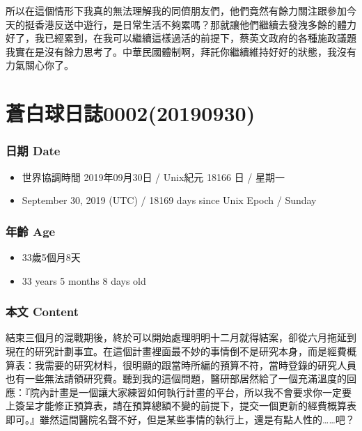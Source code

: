 \documentclass[a5paper, 12pt
]{book}
\providecommand{\tightlist}{%
  \setlength{\itemsep}{0pt}\setlength{\parskip}{0pt}}
\begin{document}
所以在這個情形下我真的無法理解我的同儕朋友們，他們竟然有餘力關注跟參加今天的挺香港反送中遊行，是日常生活不夠累嗎？那就讓他們繼續去發洩多餘的體力好了，我已經累到，在我可以繼續這樣過活的前提下，蔡英文政府的各種施政議題我實在是沒有餘力思考了。中華民國體制啊，拜託你繼續維持好好的狀態，我沒有力氣關心你了。

\hypertarget{ux84bcux767dux7403ux65e5ux8a8c000220190930}{%
\section{蒼白球日誌0002(20190930)}\label{ux84bcux767dux7403ux65e5ux8a8c000220190930}}

\hypertarget{ux65e5ux671f-date-1}{%
\subsubsection{日期 Date}\label{ux65e5ux671f-date-1}}

\begin{itemize}
\tightlist
\item
  世界協調時間 2019年09月30日 / Unix紀元 18166 日 / 星期一
\item
  September 30, 2019 (UTC) / 18169 days since Unix Epoch / Sunday
\end{itemize}

\hypertarget{ux5e74ux9f61-age-1}{%
\subsubsection{年齡 Age}\label{ux5e74ux9f61-age-1}}

\begin{itemize}
\tightlist
\item
  33歲5個月8天
\item
  33 years 5 months 8 days old
\end{itemize}

\hypertarget{ux672cux6587-content-1}{%
\subsubsection{本文 Content}\label{ux672cux6587-content-1}}

結束三個月的混戰期後，終於可以開始處理明明十二月就得結案，卻從六月拖延到現在的研究計劃事宜。在這個計畫裡面最不妙的事情倒不是研究本身，而是經費概算表：我需要的研究材料，很明顯的跟當時所編的預算不符，當時登錄的研究人員也有一些無法請領研究費。聽到我的這個問題，醫研部居然給了一個充滿溫度的回應：『院內計畫是一個讓大家練習如何執行計畫的平台，所以我不會要求你一定要上簽呈才能修正預算表，請在預算總額不變的前提下，提交一個更新的經費概算表即可。』雖然這間醫院名聲不好，但是某些事情的執行上，還是有點人性的\ldots\ldots 吧？
\end{document}
